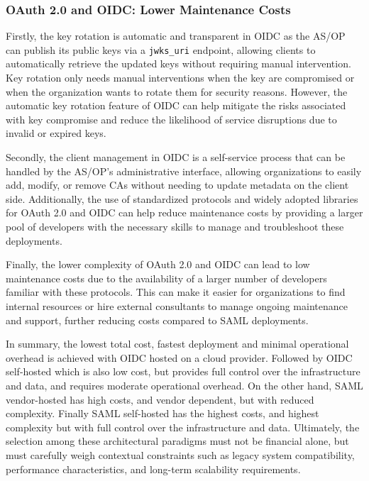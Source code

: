 \documentclass[../memoire.tex]{subfiles}
\begin{document}
\subsubsection{OAuth 2.0 and OIDC: Lower Maintenance Costs}

Firstly, the key rotation is automatic and transparent in OIDC as the AS/OP can publish its public keys via a \texttt{jwks\_uri} endpoint, allowing clients to automatically retrieve the updated keys without requiring manual intervention. Key rotation only needs manual interventions when the key are compromised or when the organization wants to rotate them for security reasons. However, the automatic key rotation feature of OIDC can help mitigate the risks associated with key compromise and reduce the likelihood of service disruptions due to invalid or expired keys.

Secondly, the client management in OIDC is a self-service process that can be handled by the AS/OP's administrative interface, allowing organizations to easily add, modify, or remove CAs without needing to update metadata on the client side. Additionally, the use of standardized protocols and widely adopted libraries for OAuth 2.0 and OIDC can help reduce maintenance costs by providing a larger pool of developers with the necessary skills to manage and troubleshoot these deployments.

Finally, the lower complexity of OAuth 2.0 and OIDC can lead to low maintenance costs due to the availability of a larger number of developers familiar with these protocols. This can make it easier for organizations to find internal resources or hire external consultants to manage ongoing maintenance and support, further reducing costs compared to SAML deployments.

In summary, the lowest total cost, fastest deployment and minimal operational overhead is achieved with OIDC hosted on a cloud provider. Followed by OIDC self-hosted which is also low cost, but provides full control over the infrastructure and data, and requires moderate operational overhead. On the other hand, SAML vendor-hosted has high costs, and vendor dependent, but with reduced complexity. Finally SAML self-hosted has the highest costs, and highest complexity but with full control over the infrastructure and data. Ultimately, the selection among these architectural paradigms must not be financial alone, but must carefully weigh contextual constraints such as legacy system compatibility, performance characteristics, and long-term scalability requirements.
\end{document}
